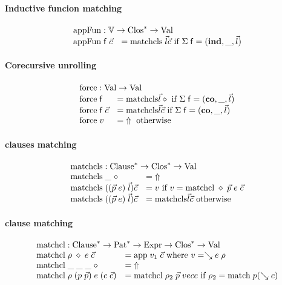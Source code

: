 \paragraph*{Inductive funcion matching}
\[
\begin{array}{ll}
\multicolumn{2}{l}{\apf : \cV \ra \ves{\Clos} \ra \Val}\\
\apf \; \ff \; \vec{c} & = \matchcls \; \vec{l} \vec{c} \mbox{ if } \Sig \; \ff = (\ind,\_,\vec{l}) 
\end{array}
\]

\paragraph*{Corecursive unrolling}
\[
\begin{array}{ll}
\multicolumn{2}{l}{\forc : \Val \ra \Val }\\
\forc \; \ff & = \matchcls \vec{l} \diamond \mbox{ if } \Sig \; \ff = (\co,\_,\vec{l})  \\
\forc \; \ff \; \vec{c} & = \matchcls \vec{l} \vec{c} \mbox{ if } \Sig \; \ff = (\co,\_,\vec{l})\\ 
\forc \; v & = \stuck \mbox{ otherwise}
\end{array}
\]

\paragraph*{clauses matching}
\[
\begin{array}{ll}
\multicolumn{2}{l}{\matchcls : \ves{\Clause} \ra \ves{\Clos} \ra \Val}\\
\matchcls \; \_ \; \diamond & = \stuck \\
\matchcls \;  ((\vec{p} \; e)\;\vec{l}) \vec{c} & = v \mbox{ if } v = \matchcl \; \diamond \; \vec{p} \; e \;  \vec{c} \\
\matchcls \; ((\vec{p} \; e)\;\vec{l}) \vec{c} & = \matchcls \vec{l} \vec{c} \mbox{ otherwise}  
\end{array}
\]

\paragraph*{clause matching}
\[
\begin{array}{ll}
\multicolumn{2}{l}{\matchcl : \ves{\Clause} \ra \ves{\Pat} \ra \Expr \ra \ves{\Clos} \ra \Val}\\
\matchcl \; \rho \; \diamond \; e \; \vec{c} & = \ap \; v_1 \; \vec{c} \mbox{ where } v = \wh e \; \rho \\
\matchcl \; \_ \; \_\; \_ \; \diamond & = \stuck \\
\matchcl \; \rho \; (p \; \vec{p}) \; e \; (c \; \vec{c}) & = \matchcl \; \rho_2 \; \vec{p} \; vec{c} \mbox{ if } \rho_2 = \match \; p (\wh c)   
\end{array}
\]

